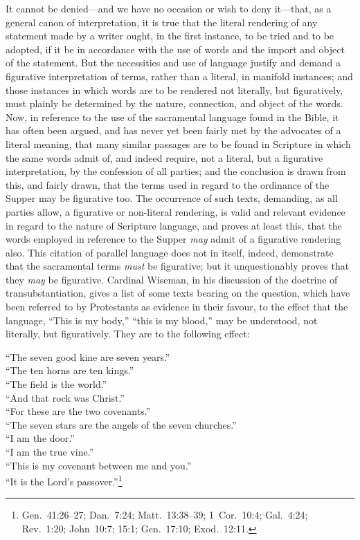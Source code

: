 \documentclass[
  english,
]{book}
\begin{document}
It cannot be denied---and we have no occasion or wish to deny it---that, as a general canon of interpretation, it is true that the literal rendering of any statement made by a writer ought, in the first instance, to be tried and to be adopted, if it be in accordance with the use of words and the import and object of the statement. But the necessities and use of language justify and demand a figurative interpretation of terms, rather than a literal, in manifold instances; and those instances in which words are to be rendered not literally, but figuratively, must plainly be determined by the nature, connection, and object of the words. Now, in reference to the use of the sacramental language found in the Bible, it has often been argued, and has never yet been fairly met by the advocates of a literal meaning, that many similar passages are to be found in Scripture in which the same words admit of, and indeed require, not a literal, but a figurative interpretation, by the confession of all parties; and the conclusion is drawn from this, and fairly drawn, that the terms used in regard to the ordinance of the Supper may be figurative too. The occurrence of such texts, demanding, as all parties allow, a figurative or non-literal rendering, is valid and relevant evidence in regard to the nature of Scripture language, and proves at least this, that the words employed in reference to the Supper \emph{may} admit of a figurative rendering also. This citation of parallel language does not in itself, indeed, demonstrate that the sacramental terms \emph{must} be figurative; but it unquestionably proves that they \emph{may} be figurative. Cardinal Wiseman, in his discussion of the doctrine of transubstantiation, gives a list of some texts bearing on the question, which have been referred to by Protestants as evidence in their favour, to the effect that the language, ``This is my body,'' ``this is my blood,'' may be understood, not literally, but figuratively. They are to the following effect:

``The seven good kine are seven years.''\\
``The ten horns are ten kings.''\\
``The field is the world.''\\
``And that rock was Christ.''\\
``For these are the two covenants.''\\
``The seven stars are the angels of the seven churches.''\\
``I am the door.''\\
``I am the true vine.''\\
``This is my covenant between me and you.''\\
``It is the Lord's passover.''\footnote{Gen.~41:26--27; Dan.~7:24; Matt.~13:38--39; 1~Cor.~10:4; Gal.~4:24; Rev.~1:20; John~10:7; 15:1; Gen.~17:10; Exod.~12:11.}
\end{document}

